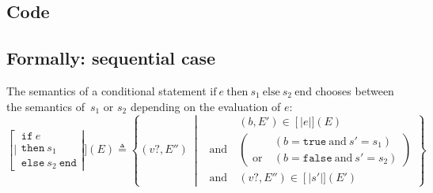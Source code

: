 \documentclass{book}
\newcommand\syntt[1]{\mathtt{#1}}
\newcommand\ife[3]{\text{if}\ #1\ \text{then}\ #2\ \text{else}\ #3\ \text{end}}
\newcommand\llbracket{[|}
\newcommand\rrbracket{|]}
\newcommand\interp[1]{\left\llbracket #1 \right\rrbracket}
\newcommand\st[0]{\ \middle|\ }
\begin{document}
  \subsection{Code}

  \subsection{Formally: sequential case}
  The semantics of a conditional statement $\ife{e}{s_1}{s_2}$ chooses between
  the semantics of~$s_1$ or $s_2$ depending on the evaluation of $e$:
  \begin{equation}
    \interp{\begin{array}{l}
      \syntt{if}\ e\\
      \syntt{then}\ s_1\\
      \syntt{else}\ s_2\ \syntt{end}
    \end{array}} (E) \triangleq
      \left\{ (v?, E'') \st{} \ 
      \begin{aligned}
        & (b, E') \in \interp{e} (E)
        \\ \text{and}\ &
        \left( \begin{aligned}
          & \left(b = \syntt{true} \ \text{and} \ s' = s_1 \right)
          \\ \text{or}\ &
          \left( b = \syntt{false} \ \text{and}\ s' = s_2 \right)
        \end{aligned} \right)
        \\ \text{and}\ &
        (v?, E'') \in \interp{s'} (E')
      \end{aligned}
      \right\}
    \label{eq:sem-seq-scond}
  \end{equation}
\end{document}

